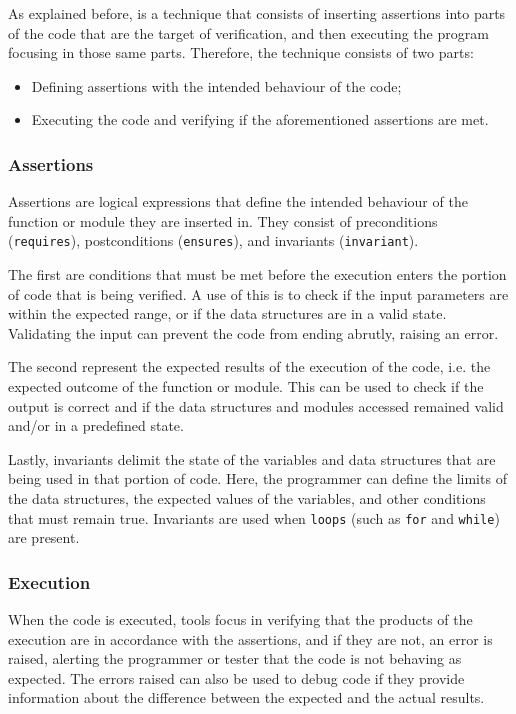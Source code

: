 As explained before, \rac is a technique that consists of inserting assertions into 
parts of the code that are the target of verification, and then executing the program 
focusing in those same parts. Therefore, the technique consists of two parts:

\begin{itemize}
    \item Defining assertions with the intended behaviour of the code;
    \item Executing the code and verifying if the aforementioned assertions are met.
\end{itemize}

\subsubsection{Assertions}
\label{subsub:assertions}

Assertions are logical expressions that define the intended behaviour of the 
function or module they are inserted in. They consist of preconditions (\texttt{requires}), 
postconditions (\texttt{ensures}), and invariants (\texttt{invariant}).

The first are conditions that must be met before the execution enters 
the portion of code that is being verified. A use of this is to check if the input 
parameters are within the expected range, or if the data structures are in a valid 
state. Validating the input can prevent the code from ending abrutly, raising an error.

The second represent the expected results of the execution of the code, i.e. the expected 
outcome of the function or module. This can be used to check if the output is correct and 
if the data structures and modules accessed remained valid and/or in a predefined state. 

Lastly, invariants delimit the state of the variables and data structures that are 
being used in that portion of code. Here, the programmer can define the limits of 
the data structures, the expected values of the variables, and other conditions that 
must remain true. Invariants are used when \texttt{loops} (such as \texttt{for} and 
\texttt{while}) are present.

\subsubsection{Execution}
\label{subsub:execution}

When the code is executed, tools focus in verifying that the products of 
the execution are in accordance with the assertions, and if they are not, an error is 
raised, alerting the programmer or tester that the code is not behaving as expected. 
The errors raised can also be used to debug code if they provide information about the 
difference between the expected and the actual results.

